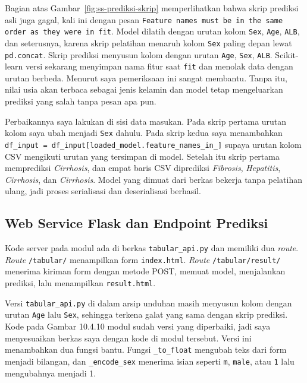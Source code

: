 \documentclass[a4paper,oneside,12pt]{report}
\begin{document}
Bagian atas Gambar~\ref{fig:ss-prediksi-skrip} memperlihatkan bahwa skrip prediksi asli juga gagal, kali ini dengan pesan \texttt{Feature names must be in the same order as they were in fit}. Model dilatih dengan urutan kolom \texttt{Sex}, \texttt{Age}, \texttt{ALB}, dan seterusnya, karena skrip pelatihan menaruh kolom \texttt{Sex} paling depan lewat \texttt{pd.concat}. Skrip prediksi menyusun kolom dengan urutan \texttt{Age}, \texttt{Sex}, \texttt{ALB}. Scikit-learn versi sekarang menyimpan nama fitur saat \texttt{fit} dan menolak data dengan urutan berbeda. Menurut saya pemeriksaan ini sangat membantu. Tanpa itu, nilai usia akan terbaca sebagai jenis kelamin dan model tetap mengeluarkan prediksi yang salah tanpa pesan apa pun.

Perbaikannya saya lakukan di sisi data masukan. Pada skrip pertama urutan kolom saya ubah menjadi \texttt{Sex} dahulu. Pada skrip kedua saya menambahkan \texttt{df\_input = df\_input[loaded\_model.feature\_names\_in\_]} supaya urutan kolom CSV mengikuti urutan yang tersimpan di model. Setelah itu skrip pertama memprediksi \textit{Cirrhosis}, dan empat baris CSV diprediksi \textit{Fibrosis}, \textit{Hepatitis}, \textit{Cirrhosis}, dan \textit{Cirrhosis}. Model yang dimuat dari berkas bekerja tanpa pelatihan ulang, jadi proses serialisasi dan deserialisasi berhasil.

\subsection{Web Service Flask dan Endpoint Prediksi}
Kode server pada modul ada di berkas \texttt{tabular\_api.py} dan memiliki dua \textit{route}. \textit{Route} \texttt{/tabular/} menampilkan form \texttt{index.html}. \textit{Route} \texttt{/tabular/result/} menerima kiriman form dengan metode POST, memuat model, menjalankan prediksi, lalu menampilkan \texttt{result.html}.

Versi \texttt{tabular\_api.py} di dalam arsip unduhan masih menyusun kolom dengan urutan \texttt{Age} lalu \texttt{Sex}, sehingga terkena galat yang sama dengan skrip prediksi. Kode pada Gambar 10.4.10 modul sudah versi yang diperbaiki, jadi saya menyesuaikan berkas saya dengan kode di modul tersebut. Versi ini menambahkan dua fungsi bantu. Fungsi \texttt{\_to\_float} mengubah teks dari form menjadi bilangan, dan \texttt{\_encode\_sex} menerima isian seperti \texttt{m}, \texttt{male}, atau \texttt{1} lalu mengubahnya menjadi 1.
\end{document}
